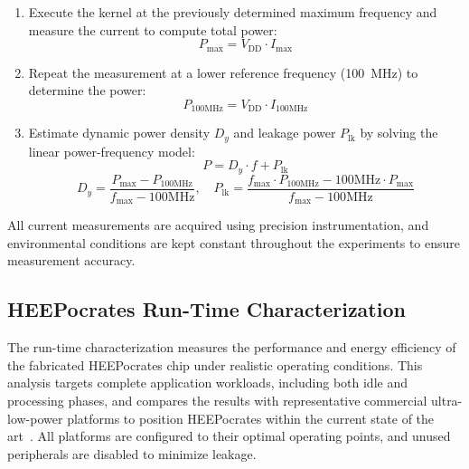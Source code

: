 \begin{itemize}
                \begin{enumerate}
                    \item Execute the kernel at the previously determined maximum frequency and measure the current to compute total power:
                    \[
                        P_{\text{max}} = V_{\text{DD}} \cdot I_{\text{max}}
                    \]
                    \item Repeat the measurement at a lower reference frequency (\SI{100}{\mega\hertz}) to determine the power:
                    \[
                        P_{100\text{MHz}} = V_{\text{DD}} \cdot I_{100\text{MHz}}
                    \]
                    \item Estimate dynamic power density \(D_y\) and leakage power \(P_{\text{lk}}\) by solving the linear power-frequency model:
                    \[
                        P = D_y \cdot f + P_{\text{lk}}
                    \]
                    \[
                        D_y = \frac{P_{\text{max}} - P_{100\text{MHz}}}{f_{\text{max}} - 100\text{MHz}}, \quad
                        P_{\text{lk}} = \frac{f_{\text{max}} \cdot P_{100\text{MHz}} - 100\text{MHz} \cdot P_{\text{max}}}{f_{\text{max}} - 100\text{MHz}}
                    \]
                \end{enumerate}
            
                All current measurements are acquired using precision instrumentation, and environmental conditions are kept constant throughout the experiments to ensure measurement accuracy.
            \end{itemize}

        \subsection{HEEPocrates Run-Time Characterization}
            
            The run-time characterization measures the performance and energy efficiency of the fabricated \mbox{HEEPocrates} chip under realistic operating conditions. This analysis targets complete application workloads, including both idle and processing phases, and compares the results with representative commercial ultra-low-power platforms to position \mbox{HEEPocrates} within the current state of the art~\cite{biomed}. All platforms are configured to their optimal operating points, and unused peripherals are disabled to minimize leakage.

            \vspace{-1em}
